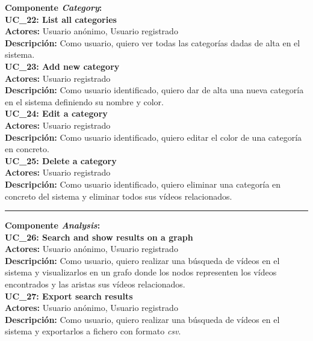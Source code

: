\documentclass[11pt,a4paper]{article}
\begin{document}
\noindent\textbf{Componente \textit{Category}:}
\\

\noindent\textbf{UC\_22: List all categories}\\
\textbf{Actores:} Usuario anónimo, Usuario registrado\\
\textbf{Descripción:} Como usuario, quiero ver todas las categorías dadas de alta en el sistema.
\\

\noindent\textbf{UC\_23: Add new category}\\
\textbf{Actores:} Usuario registrado\\
\textbf{Descripción:} Como usuario identificado, quiero dar de alta una nueva categoría en el sistema definiendo su nombre y color.
\\

\noindent\textbf{UC\_24: Edit a category}\\
\textbf{Actores:} Usuario registrado\\
\textbf{Descripción:} Como usuario identificado, quiero editar el color de una categoría en concreto.
\\

\noindent\textbf{UC\_25: Delete a category}\\
\textbf{Actores:} Usuario registrado\\
\textbf{Descripción:} Como usuario identificado, quiero eliminar una categoría en concreto del sistema y eliminar todos sus vídeos relacionados.
\\

\begin{center}\rule{10cm}{0.4pt}\end{center}

\noindent\textbf{Componente \textit{Analysis}:}
\\

\noindent\textbf{UC\_26: Search and show results on a graph}\\
\textbf{Actores:} Usuario anónimo, Usuario registrado\\
\textbf{Descripción:} Como usuario, quiero realizar una búsqueda de vídeos en el sistema y visualizarlos en un grafo donde los nodos representen los vídeos encontrados y las aristas sus vídeos relacionados.
\\

\noindent\textbf{UC\_27: Export search results}\\
\textbf{Actores:} Usuario anónimo, Usuario registrado\\
\textbf{Descripción:} Como usuario, quiero realizar una búsqueda de vídeos en el sistema y exportarlos a fichero con formato \textit{csv}.
\\
\end{document}

